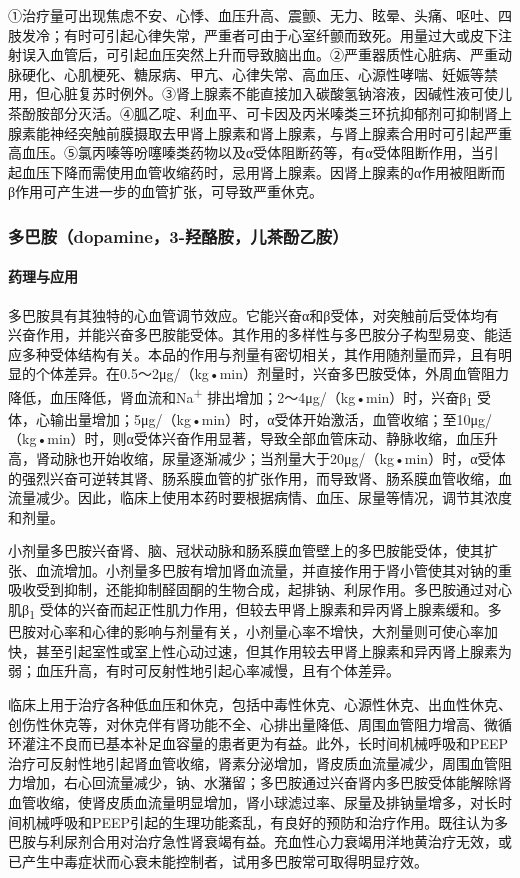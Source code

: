 ①治疗量可出现焦虑不安、心悸、血压升高、震颤、无力、眩晕、头痛、呕吐、四肢发冷；有时可引起心律失常，严重者可由于心室纤颤而致死。用量过大或皮下注射误入血管后，可引起血压突然上升而导致脑出血。②严重器质性心脏病、严重动脉硬化、心肌梗死、糖尿病、甲亢、心律失常、高血压、心源性哮喘、妊娠等禁用，但心脏复苏时例外。③肾上腺素不能直接加入碳酸氢钠溶液，因碱性液可使儿茶酚胺部分灭活。④胍乙啶、利血平、可卡因及丙米嗪类三环抗抑郁剂可抑制肾上腺素能神经突触前膜摄取去甲肾上腺素和肾上腺素，与肾上腺素合用时可引起严重高血压。⑤氯丙嗪等吩噻嗪类药物以及α受体阻断药等，有α受体阻断作用，当引起血压下降而需使用血管收缩药时，忌用肾上腺素。因肾上腺素的α作用被阻断而β作用可产生进一步的血管扩张，可导致严重休克。

\subsubsection{多巴胺（dopamine，3-羟酪胺，儿茶酚乙胺）}

\paragraph{药理与应用}

多巴胺具有其独特的心血管调节效应。它能兴奋α和β受体，对突触前后受体均有兴奋作用，并能兴奋多巴胺能受体。其作用的多样性与多巴胺分子构型易变、能适应多种受体结构有关。本品的作用与剂量有密切相关，其作用随剂量而异，且有明显的个体差异。在0.5～2μg/（kg•min）剂量时，兴奋多巴胺受体，外周血管阻力降低，血压降低，肾血流和Na\textsuperscript{+}
排出增加；2～4μg/（kg•min）时，兴奋β\textsubscript{1}
受体，心输出量增加；5μg/（kg•min）时，α受体开始激活，血管收缩；至10μg/（kg•min）时，则α受体兴奋作用显著，导致全部血管床动、静脉收缩，血压升高，肾动脉也开始收缩，尿量逐渐减少；当剂量大于20μg/（kg•min）时，α受体的强烈兴奋可逆转其肾、肠系膜血管的扩张作用，而导致肾、肠系膜血管收缩，血流量减少。因此，临床上使用本药时要根据病情、血压、尿量等情况，调节其浓度和剂量。

小剂量多巴胺兴奋肾、脑、冠状动脉和肠系膜血管壁上的多巴胺能受体，使其扩张、血流增加。小剂量多巴胺有增加肾血流量，并直接作用于肾小管使其对钠的重吸收受到抑制，还能抑制醛固酮的生物合成，起排钠、利尿作用。多巴胺通过对心肌β\textsubscript{1}
受体的兴奋而起正性肌力作用，但较去甲肾上腺素和异丙肾上腺素缓和。多巴胺对心率和心律的影响与剂量有关，小剂量心率不增快，大剂量则可使心率加快，甚至引起室性或室上性心动过速，但其作用较去甲肾上腺素和异丙肾上腺素为弱；血压升高，有时可反射性地引起心率减慢，且有个体差异。

临床上用于治疗各种低血压和休克，包括中毒性休克、心源性休克、出血性休克、创伤性休克等，对休克伴有肾功能不全、心排出量降低、周围血管阻力增高、微循环灌注不良而已基本补足血容量的患者更为有益。此外，长时间机械呼吸和PEEP治疗可反射性地引起肾血管收缩，肾素分泌增加，肾皮质血流量减少，周围血管阻力增加，右心回流量减少，钠、水潴留；多巴胺通过兴奋肾内多巴胺受体能解除肾血管收缩，使肾皮质血流量明显增加，肾小球滤过率、尿量及排钠量增多，对长时间机械呼吸和PEEP引起的生理功能紊乱，有良好的预防和治疗作用。既往认为多巴胺与利尿剂合用对治疗急性肾衰竭有益。充血性心力衰竭用洋地黄治疗无效，或已产生中毒症状而心衰未能控制者，试用多巴胺常可取得明显疗效。

